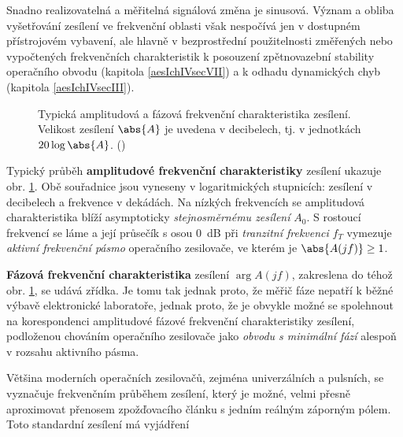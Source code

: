         Snadno realizovatelná a měřitelná signálová změna je sinusová. Význam a obliba vyšetřování
        zesílení ve frekvenční oblasti však nespočívá jen v dostupném přístrojovém vybavení, ale
        hlavně v bezprostřední použitelnosti změřených nebo vypočtených frekvenčních charakteristik
        k posouzení zpětnovazební stability operačního obvodu (kapitola \ref{aesIchIVsecVII}) a k
        odhadu dynamických chyb (kapitola \ref{aesIchIVsecIII}).

        \begin{figure}[ht!] %
          \centering
          \caption{Typická amplitudová a fázová frekvenční charakteristika zesílení. Velikost
                  zesílení \(\abs{A}\) je uvedena v decibelech, tj. v jednotkách \(20\log\abs{A}\).
                  (\cite[s.~24]{Dostal})}
          \label{aes:fig052}
        \end{figure}

        Typický průběh \textbf{amplitudové frekvenční charakteristiky} zesílení  ukazuje
        obr. \ref{aes:fig052}. Obě souřadnice jsou vyneseny v logaritmických stupnicích: zesílení v
        decibelech a frekvence v dekádách. Na nízkých frekvencích se amplitudová charakteristika
        blíží asymptoticky \emph{stejnosměrnému zesílení} \(A_0\). S rostoucí frekvencí se láme a
        její průsečík s osou \SI{0}{\dB} při \emph{tranzitní frekvenci} \(f_T\) vymezuje
        \emph{aktivní frekvenční pásmo} operačního zesilovače, ve kterém je \(\abs{A(jf)} \geq1\).

        \textbf{Fázová frekvenční charakteristika} zesílení \(\arg{A(jf)}\), zakreslena do téhož
        obr. \ref{aes:fig052}, se udává zřídka. Je tomu tak jednak proto, že měřič fáze nepatří k
        běžné výbavě elektronické laboratoře, jednak proto, že je obvykle možné se spolehnout na
        korespondenci amplitudové fázové frekvenční charakteristiky zesílení, podloženou chováním
        operačního zesilovače jako \emph{obvodu s minimální fází} alespoň v rozsahu aktivního pásma.

        Většina moderních operačních zesilovačů, zejména univerzálních a pulsních, se vyznačuje
        frekvenčním průběhem zesílení, který je možné, velmi přesně aproximovat přenosem
        zpožďovacího článku s jedním reálným záporným pólem. Toto standardní zesílení má vyjádření

